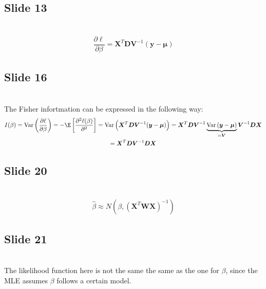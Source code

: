 \subsection{Slide 13}\hfill\\

\begin{equation*}
  \begin{gathered}
    \dfrac{\partial \ell}{\partial \beta} = \boldsymbol{X}^T\boldsymbol{DV}^{-1}(\boldsymbol{y}-\boldsymbol{\mu})
  \end{gathered}
\end{equation*}
\par\bigskip
\subsection{Slide 16}\hfill\\
\noindent The Fisher infortmation can be expressed in the following way:
\begin{equation*}
  \begin{gathered}
    I(\beta) = \text{Var}\left(\dfrac{\partial \ell}{\partial \beta}\right) = -\E\left[\dfrac{\partial^2\ell(\beta)}{\partial^2}\right] = \text{Var}\left(\boldsymbol{X}^T\boldsymbol{DV}^{-1}(\boldsymbol{y}-\boldsymbol{\mu})\right) = \boldsymbol{X}^T\boldsymbol{DV}^{-1}\underbrace{\text{Var}\left(\boldsymbol{y}-\boldsymbol{\mu}\right)}_{\substack{=\boldsymbol{V}}}\boldsymbol{V}^{-1}\boldsymbol{DX}\\
    = \boldsymbol{X}^T\boldsymbol{DV}^{-1}\boldsymbol{DX}
  \end{gathered}
\end{equation*}
\par\bigskip
\subsection{Slide 20}\hfill\\
\begin{equation*}
  \begin{gathered}
    \widehat{\beta}\approx N\left(\beta,(\boldsymbol{X}^T\boldsymbol{WX})^{-1}\right)
  \end{gathered}
\end{equation*}
\par\bigskip
\subsection{Slide 21}\hfill\\
\noindent The likelihood function here is not the same the same as the one for $\beta$, since the MLE assumes $\beta$ follows a certain model.
\par\bigskip
